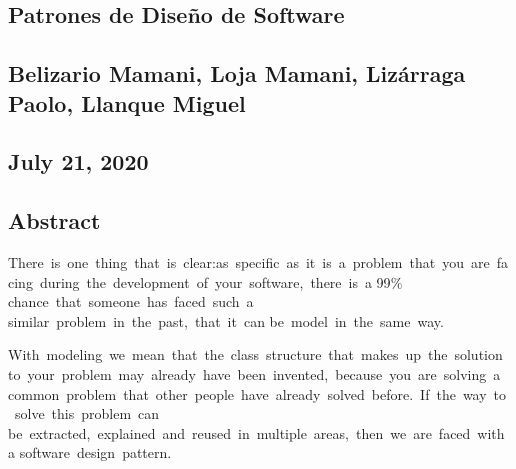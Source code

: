 \documentclass[12pt]{article}
\begin{document}
\begin{adjustwidth}{0.56in}{0.57in}
\section*{Patrones de Diseño de Software}
\end{adjustwidth}

\begin{adjustwidth}{0.56in}{0.57in}
\section*{Belizario Mamani, Loja Mamani, Lizárraga Paolo, Llanque Miguel}
\end{adjustwidth}

\begin{adjustwidth}{0.56in}{0.57in}
\section*{July 21, 2020}
\end{adjustwidth}

\begin{adjustwidth}{0.56in}{0.57in}
\subsection*{Abstract}
\end{adjustwidth}


\vspace{\baselineskip}
{\fontsize{10pt}{12.0pt}\selectfont There is one thing that is clear:as specific as it is a problem that you are facing during the development of your software, there is a 99$\%$  chance that someone has faced such a similar problem in the past, that it can be model in the same way. \par}\par

{\fontsize{10pt}{12.0pt}\selectfont With modeling we mean that the class structure that makes up the solution to your problem may already have been invented, because you are solving a common problem that other people have already solved before. If the way to solve this problem can be extracted, explained and reused in multiple areas, then we are faced with a software design pattern. \par}\par
\end{document}
